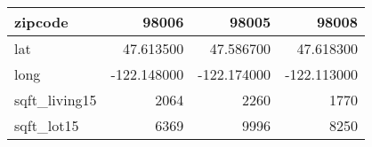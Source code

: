 \begin{table}[H]
\begin{tabular}{|l|r|r|r|}
\hline zipcode & \cellcolor[rgb]{0.9, 0.54, 0.52} 98006 & 98005 & 98008 \\
\hline lat & \cellcolor[rgb]{0.9, 0.54, 0.52} 47.613500 & 47.586700 & 47.618300 \\
\hline long & \cellcolor[rgb]{0.9, 0.54, 0.52} -122.148000 & \cellcolor[rgb]{0.9, 0.54, 0.52} -122.174000 & \cellcolor[rgb]{0.9, 0.54, 0.52} -122.113000 \\
\hline sqft\_living15 & \cellcolor[rgb]{0.9, 0.54, 0.52} 2064 & 2260 & 1770 \\
\hline sqft\_lot15 & \cellcolor[rgb]{0.9, 0.54, 0.52} 6369 & 9996 & 8250 \\
\hline
\end{tabular}
\end{table}

